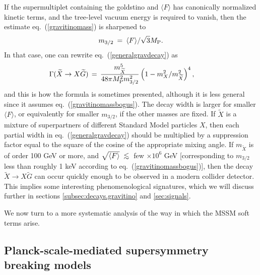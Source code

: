 \documentclass[12pt]{article}
\def\beq{\begin{eqnarray}}
\def\eeq{\end{eqnarray}}
\def\stilde{\widetilde}
\def\MPlanck{M_{\rm P}}
\def\centeron#1#2{{\setbox0=\hbox{#1}\setbox1=\hbox{#2}\ifdim
\wd1>\wd0\kern.5\wd1\kern-.5\wd0\fi
\copy0\kern-.5\wd0\kern-.5\wd1\copy1\ifdim\wd0>\wd1
\kern.5\wd0\kern-.5\wd1\fi}}
\def\ltap{\;\centeron{\raise.35ex\hbox{$<$}}{\lower.65ex\hbox{$\sim$}}\;}
\def\lsim{\mathrel{\ltap}}
\begin{document}
If the supermultiplet containing the goldstino and $\langle F \rangle$ has
canonically normalized kinetic terms, and the tree-level
vacuum energy is required to
vanish, then the estimate eq.~(\ref{gravitinomass}) is
sharpened to
\beq
m_{3/2} \>=\> {\langle F \rangle / \sqrt{3} \MPlanck} .
\label{gravitinomassbogus}
\eeq
In that case, one can rewrite eq.~(\ref{generalgravdecay}) as
\beq
\Gamma(\stilde X \rightarrow X\stilde G) \,=\,
{m_{\stilde X}^5 \over 48 \pi \MPlanck^2 m_{3/2}^2}
\left ( 1 - {m_X^2/ m_{\stilde X}^2} \right )^4 ,
\qquad\>\>{}
\label{specificgravdecay}
\eeq
and this is how the formula is sometimes presented, although it is less 
general since it assumes eq.~(\ref{gravitinomassbogus}). The 
decay width is larger for smaller $\langle F \rangle$, or equivalently for 
smaller $m_{3/2}$, if the other masses are fixed.  If $\stilde X$ is a 
mixture of superpartners of different Standard Model particles $X$, then 
each partial width in eq.~(\ref{generalgravdecay}) should be multiplied by a 
suppression factor equal to the square of the cosine of the appropriate 
mixing angle. If $m_{\stilde X}$ is of order 100 GeV or more, and $\sqrt{ 
\langle F\rangle } \lsim$ few $\times 10^6$ GeV [corresponding to 
$m_{3/2}$ less than roughly 1 keV according to 
eq.~(\ref{gravitinomassbogus})], then the decay $\stilde X \rightarrow X 
\stilde G$ can occur quickly enough to be observed in a modern collider 
detector. This implies some interesting phenomenological signatures, 
which we will discuss further in sections \ref{subsec:decays.gravitino} 
and \ref{sec:signals}.

We now turn to a more systematic analysis of the way in which the MSSM 
soft terms arise.

\subsection{Planck-scale-mediated supersymmetry breaking
models}\label{subsec:origins.sugra}
\setcounter{equation}{0}
\setcounter{footnote}{1}
\end{document}
